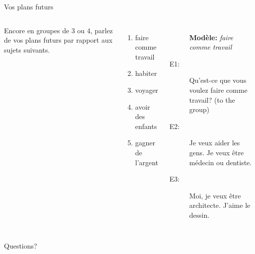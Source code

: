 \documentclass{beamer}
\begin{document}
  \begin{frame}{Vos plans futurs}
    \begin{columns}
        Encore en groupes de 3 ou 4, parlez de vos plans futurs par rapport aux sujets suivants. \\
        \begin{enumerate}
          \item faire comme travail
          \item habiter
          \item voyager
          \item avoir des enfants
          \item gagner de l'argent
        \end{enumerate}
        \begin{description}
          \item[] \textbf{Modèle:} \emph{faire comme travail}
          \item[E1:] Qu'est-ce que vous voulez faire comme travail? (to the group)
          \item[] 
          \item[E2:] Je veux aider les gens. Je veux être médecin ou dentiste.
          \item[] 
          \item[E3:] Moi, je veux être architecte. J'aime le dessin.
          \item[] 
        \end{description}
    \end{columns}
  \end{frame}

  \begin{frame}{}
    \begin{center}
      \Large Questions?
    \end{center}
  \end{frame}
\end{document}
